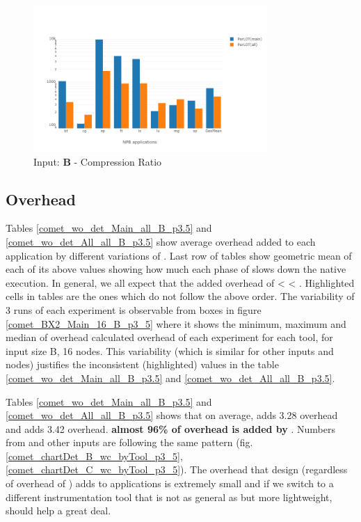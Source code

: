 \begin{figure}[!t]
\centering
\includegraphics[width=3.5in]{figs.comet.newMed/comet_chartAvg_cr_B_p3_5.png}
\caption{ Input: \textbf{B}  - Compression Ratio
}
\label{comet_chartAvg_cr_B_p3_5}
\end{figure}
  
  
\subsection{ \pininit Overhead} 
\label{subsec:pinit}
Tables \ref{comet_wo_det_Main_all_B_p3.5} and \ref{comet_wo_det_All_all_B_p3.5} show average overhead added to each application by different variations of \parlot. Last row of tables show geometric mean of each of its above values showing how much each phase of \parlot slows down the native execution. In general, we all expect that the added overhead of  \pininit < \parlot < \parlotnc. Highlighted cells in tables are the ones which do not follow the above order. The variability of 3 runs of each experiment is observable from boxes in figure \ref{comet_BX2_Main_16_B_p3_5} where it shows the minimum, maximum and median of overhead calculated overhead of each experiment for each tool, for input size B, 16 nodes.
This variability (which is similar for other inputs and nodes) justifies the inconsistent (highlighted) values in the table \ref{comet_wo_det_Main_all_B_p3.5} and \ref{comet_wo_det_All_all_B_p3.5}.


Tables \ref{comet_wo_det_Main_all_B_p3.5} and \ref{comet_wo_det_All_all_B_p3.5} shows that on average, \pininit adds 3.28 overhead and \parlota adds 3.42 overhead. \textbf{almost 96\% of \parlota overhead is added by \pininit} . Numbers from \parlotm and other inputs are following the same pattern (fig. \ref{comet_chartDet_B_wc_byTool_p3_5},\ref{comet_chartDet_C_wc_byTool_p3_5}).
The overhead that \parlot design (regardless of overhead of \pininit) adds to applications is extremely small and if we switch to a different instrumentation tool that is not as general as \pin but more lightweight, should help a great deal. \\

